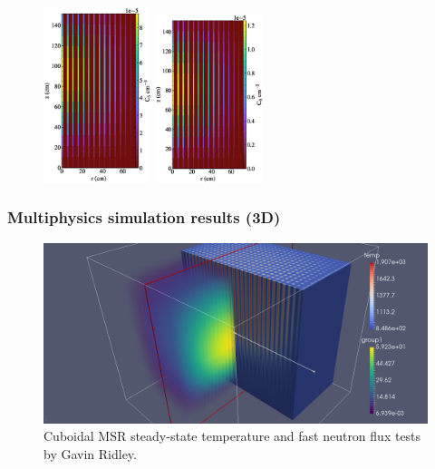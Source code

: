 \begin{frame}
\begin{figure}
   \includegraphics[width=0.28\textwidth]{./images/auto_diff_rho_pre5.eps}
   \includegraphics[width=0.28\textwidth]{./images/auto_diff_rho_pre6.eps}
    \end{figure}
\end{frame}



\begin{frame}
  \frametitle{Multiphysics simulation results (3D)}
  \begin{figure}[t]
   \vspace{-0.1in}
   \hspace*{-0.45in}
   \includegraphics[height=0.75\textheight]{./images/moltres_3D.png}
   \caption{Cuboidal \gls{MSR} steady-state temperature and fast neutron flux 
          tests by Gavin Ridley.} 
    \end{figure}

\end{frame}
